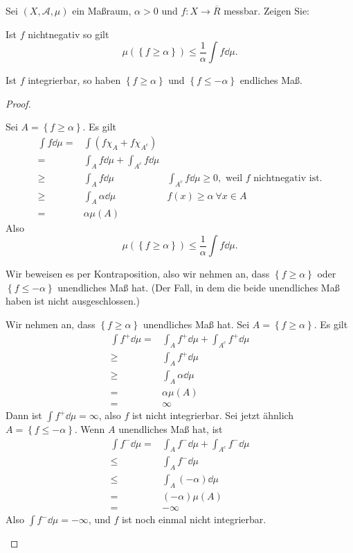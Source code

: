 \begin{Problem}
	Sei $(X,\mathcal{A},\mu)$ ein Maßraum, $\alpha>0$ und $f:X\to \overline{R}$ messbar. Zeigen Sie:
	\begin{parts}
		\item Ist $f$ nichtnegativ so gilt
			\[
				\mu\left( \left\{ f\ge \alpha \right\}  \right) \le \frac{1}{\alpha}\int f\dd{\mu}
			.\] 
		\item Ist $f$ integrierbar, so haben $\left\{ f\ge\alpha \right\} $ und $\left\{ f\le -\alpha \right\} $ endliches Maß.
	\end{parts}
\end{Problem}
\begin{proof}
	\begin{parts}
	\item Sei $A=\left\{ f\ge \alpha \right\} $. Es gilt
		\begin{align*}
			\int f\dd{\mu}=& \int \left( f\chi_A+f\chi_{A^c} \right) \\
			=& \int_A f\dd{\mu}+\int_{A^c} f\dd{\mu}\\
			\ge&\int_A f\dd{\mu} & \int_{A^c}f\dd{\mu}\ge 0,\text{ weil }f\text{ nichtnegativ ist.}\\
		\ge&\int_A \alpha \dd{\mu} & f(x)\ge \alpha~\forall x\in A\\
		=&\alpha\mu(A)
		\end{align*}
		Also
		\[
			\mu\left( \left\{ f\ge \alpha \right\}  \right) \le \frac{1}{\alpha}\int f\dd{\mu}
		.\] 
	\item Wir beweisen es per Kontraposition, also wir nehmen an, dass $\left\{ f\ge \alpha \right\} $ oder $\left\{ f\le -\alpha \right\} $ unendliches Maß hat. (Der Fall, in dem die beide unendliches Maß haben ist nicht ausgeschlossen.)

		Wir nehmen an, dass $\left\{ f\ge\alpha \right\} $ unendliches Maß hat. Sei $A=\left\{ f\ge \alpha \right\} $. Es gilt
		\begin{align*}
			\int f^+\dd{\mu}=&\int_A f^+\dd{\mu}+\int_{A^c}f^+\dd{\mu}\\
			\ge& \int_A f^+\dd{\mu}\\
			\ge& \int_A \alpha\dd{\mu}\\
			=& \alpha\mu(A)\\
			=&\infty
		\end{align*}
		Dann ist $\int f^+\dd{\mu}=\infty$, also $f$ ist nicht integrierbar.  Sei jetzt ähnlich $A=\left\{ f\le -\alpha \right\} $. Wenn $A$ unendliches Maß hat, ist
		\begin{align*}
			\int f^-\dd{\mu}=&\int_A f^-\dd{\mu}+\int_{A^c}f^-\dd{\mu}\\
			\le& \int_A f^-\dd{\mu}\\
			\le&\int_A(-\alpha)\dd{\mu}\\
			=&(-\alpha)\mu(A)\\
			=&-\infty
		\end{align*}
		Also $\int f^-\dd{\mu}=-\infty$, und $f$ ist noch einmal nicht integrierbar.\qedhere
	\end{parts}
\end{proof}
